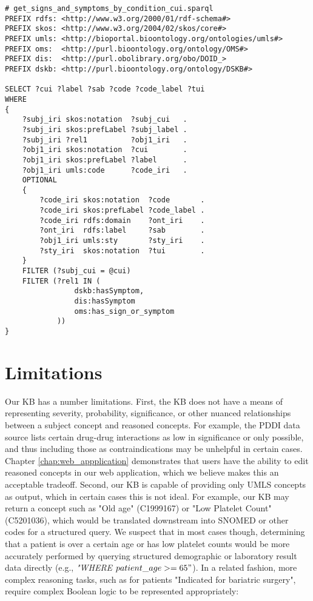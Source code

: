 \documentclass[../main.tex]{subfiles}
\begin{document}
\def\baselinestretch{1.0}    
\begin{lstlisting}
# get_signs_and_symptoms_by_condition_cui.sparql
PREFIX rdfs: <http://www.w3.org/2000/01/rdf-schema#>
PREFIX skos: <http://www.w3.org/2004/02/skos/core#>
PREFIX umls: <http://bioportal.bioontology.org/ontologies/umls#>
PREFIX oms:  <http://purl.bioontology.org/ontology/OMS#>
PREFIX dis:  <http://purl.obolibrary.org/obo/DOID_>
PREFIX dskb: <http://purl.bioontology.org/ontology/DSKB#>

SELECT ?cui ?label ?sab ?code ?code_label ?tui
WHERE 
{
    ?subj_iri skos:notation  ?subj_cui   .
    ?subj_iri skos:prefLabel ?subj_label .
    ?subj_iri ?rel1          ?obj1_iri   .
    ?obj1_iri skos:notation  ?cui        .
    ?obj1_iri skos:prefLabel ?label      .
    ?obj1_iri umls:code      ?code_iri   .
    OPTIONAL
    {
        ?code_iri skos:notation  ?code       .
        ?code_iri skos:prefLabel ?code_label .
        ?code_iri rdfs:domain    ?ont_iri    .
        ?ont_iri  rdfs:label     ?sab        .
        ?obj1_iri umls:sty       ?sty_iri    .
        ?sty_iri  skos:notation  ?tui        .
    }
    FILTER (?subj_cui = @cui) 
    FILTER (?rel1 IN (
                dskb:hasSymptom,
                dis:hasSymptom
                oms:has_sign_or_symptom
            ))
}
\end{lstlisting}
\def\baselinestretch{1.5}    

\section{Limitations}

Our KB has a number limitations. First, the KB does not have a means of representing severity, probability, significance, or other nuanced relationships between a subject concept and reasoned concepts. For example, the PDDI data source lists certain drug-drug interactions as low in significance or only possible, and thus including those as contraindications may be unhelpful in certain cases. Chapter \ref{chap:web_appplication} demonstrates that users have the ability to edit reasoned concepts in our web application, which we believe makes this an acceptable tradeoff. Second, our KB is capable of providing only UMLS concepts as output, which in certain cases this is not ideal. For example, our KB may return a concept such as "Old age" (C1999167) or "Low Platelet Count" (C5201036), which would be translated downstream into SNOMED or other codes for a structured query. We suspect that in most cases though, determining that a patient is over a certain age or has low platelet counts would be more accurately performed by querying structured demographic or laboratory result data directly (e.g., \textit{"WHERE} $patient\_age >= 65"$). In a related fashion, more complex reasoning tasks, such as for patients "Indicated for bariatric surgery", require complex Boolean logic to be represented appropriately:
\end{document}
